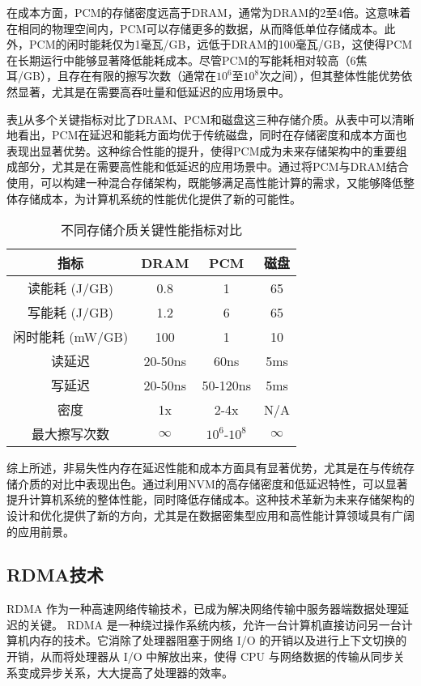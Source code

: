 在成本方面，PCM的存储密度远高于DRAM，通常为DRAM的2至4倍。这意味着在相同的物理空间内，PCM可以存储更多的数据，从而降低单位存储成本。此外，PCM的闲时能耗仅为1毫瓦/GB，远低于DRAM的100毫瓦/GB，这使得PCM在长期运行中能够显著降低能耗成本。尽管PCM的写能耗相对较高（6焦耳/GB），且存在有限的擦写次数（通常在$10^6$至$10^8$次之间），但其整体性能优势依然显著，尤其是在需要高吞吐量和低延迟的应用场景中。

表\ref{tab:storage_comparison}从多个关键指标对比了DRAM、PCM和磁盘这三种存储介质。从表中可以清晰地看出，PCM在延迟和能耗方面均优于传统磁盘，同时在存储密度和成本方面也表现出显著优势。这种综合性能的提升，使得PCM成为未来存储架构中的重要组成部分，尤其是在需要高性能和低延迟的应用场景中。通过将PCM与DRAM结合使用，可以构建一种混合存储架构，既能够满足高性能计算的需求，又能够降低整体存储成本，为计算机系统的性能优化提供了新的可能性。

\begin{table}[htb]
    \centering
    \caption{不同存储介质关键性能指标对比}
    \label{tab:storage_comparison}
    \begin{tabular}{cccc}
    \toprule
    指标       & DRAM     & PCM      & 磁盘      \\
    \midrule
    读能耗 (J/GB) & 0.8      & 1        & 65       \\
    写能耗 (J/GB) & 1.2      & 6        & 65       \\
    闲时能耗 (mW/GB) & 100      & 1        & 10       \\
    读延迟     & 20-50ns   & 60ns      & 5ms       \\
    写延迟     & 20-50ns   & 50-120ns  & 5ms       \\
    密度       & 1x       & 2-4x     & N/A      \\
    最大擦写次数   & $\infty$ & $10^6$-$10^8$ & $\infty$ \\
    \bottomrule
    \end{tabular}
    \end{table}
综上所述，非易失性内存在延迟性能和成本方面具有显著优势，尤其是在与传统存储介质的对比中表现出色。通过利用NVM的高存储密度和低延迟特性，可以显著提升计算机系统的整体性能，同时降低存储成本。这种技术革新为未来存储架构的设计和优化提供了新的方向，尤其是在数据密集型应用和高性能计算领域具有广阔的应用前景。

\subsection{RDMA技术}

 RDMA 作为一种高速网络传输技术，已成为解决网络传输中服务器端数据处理延迟的关键。 RDMA 是一种绕过操作系统内核，允许一台计算机直接访问另一台计算机内存的技术。它消除了处理器阻塞于网络 I/O 的开销以及进行上下文切换的开销，从而将处理器从 I/O 中解放出来，使得 CPU 与网络数据的传输从同步关系变成异步关系，大大提高了处理器的效率。

